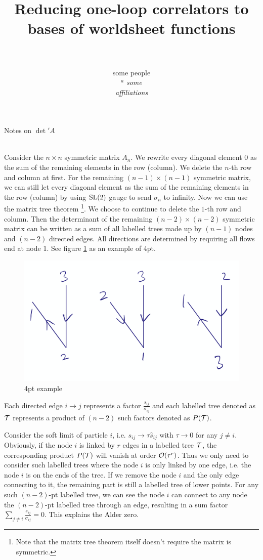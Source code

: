 \documentclass [letter, 12pt]{article}
\title{\vspace{1cm}\textbf{Reducing one-loop correlators to bases of worldsheet functions} \\ \ \\} %
\author{\hspace{-0cm}some people\\[5mm]
\hspace{-0cm} $^{a}$
{\it some}\\[-1mm] {\it affiliations} 
}
\begin{document}
\centerline{\Large{Notes on $\det'A$}}
 ~\\
 
 
Consider the $n\times n$ symmetric matrix $A_n$. We rewrite every diagonal element 
0 as the sum of the remaining elements in the row (column). We  
  delete the $n$-th  row and column at first. For the 
  remaining $(n-1)\times (n-1)$ symmetric matrix, we can still let every diagonal element as the sum of the remaining elements in the row (column) by using ${\rm SL}(2)$ gauge to
 send $\sigma_n$ to infinity.   Now we can use the matrix tree theorem \footnote{Note that the matrix tree theorem itself doesn't require the matrix is symmetric.}. We choose to continue to delete the  $1$-th  row and column. Then  the determinant of the remaining 
 $(n-2)\times (n-2)$ symmetric matrix can be written as a sum of all labelled trees made up by $(n-1)$ nodes and $(n-2)$ directed edges.   All  directions  are determined by requiring all flows end at node 1. See figure \ref{fig:universe} as an example of 4pt.
 \begin{figure}[h!]
\centering
\includegraphics[scale=.5]{4pt.PNG}
\caption{4pt example}
\label{fig:universe}
\end{figure}
 Each directed edge $i\to j$ represents a factor $\frac{s_{ij}}{\sigma_{ij}}$ and each labelled tree denoted as ${\cal T}$ represents a product of $(n-2)$ such factors denoted as $P({\cal T})$.
 
   
 Consider the soft limit of particle $i$, i.e. $s_{ij}\to \tau {\hat s}_{ij}$ with $\tau \to 0$ for any $j\neq i$. Obviously, if the node $i$ is linked by $r$ edges in a labelled tree ${\cal T}$, the corresponding product $P({\cal T})$  will vanish at order ${\cal O}(\tau^r)$.  Thus we only need to consider such labelled trees where the node $i$ is only linked by one edge, i.e. the  node $i$  is on the ends of the tree.  If we remove the node  $i$ and the only edge connecting to it, the remaining part is still a labelled tree of lower points. For any such $(n-2)$-pt labelled tree, we can see the node $i$ can connect to any node the $(n-2)$-pt labelled tree through an edge, resulting in a sum factor $\sum_{j\neq i}\frac{s_{ij}}{\sigma_{ij}}=0$. This explains the Alder zero.   
 
 
\end{document}
